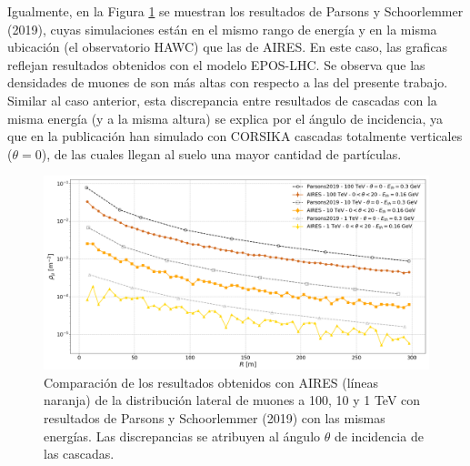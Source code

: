 \documentclass[12pt,letterpaper]{report}
\begin{document}
Igualmente, en la Figura \ref{fig:comparacion_parsons} se muestran los resultados de Parsons y Schoorlemmer (2019), cuyas simulaciones est\'an en el mismo rango de energ\'ia y en la misma ubicaci\'on (el observatorio HAWC) \cite{Parsons2019} que las de AIRES. En este caso, las graficas reflejan resultados obtenidos con el modelo EPOS-LHC. Se observa que las densidades de muones de \cite{Parsons2019} son m\'as altas con respecto a las del presente trabajo. Similar al caso anterior, esta discrepancia entre resultados de cascadas con la misma energ\'ia (y a la misma altura) se explica por el \'angulo de incidencia, ya que en la publicaci\'on han simulado con CORSIKA cascadas totalmente verticales ($\theta=0$), de las cuales llegan al suelo una mayor cantidad de part\'iculas.
	\begin{figure}[] 
	\includegraphics[width=\textwidth]{Figuras/comparacion_parsons2019}
	\caption{Comparaci\'on de los resultados obtenidos con AIRES (l\'ineas naranja) de la distribuci\'on lateral de muones a 100, 10 y 1 TeV con resultados de Parsons y Schoorlemmer (2019) \cite{Parsons2019} con las mismas energ\'ias. Las discrepancias se atribuyen al \'angulo $\theta$ de incidencia de las cascadas.}
	\label{fig:comparacion_parsons}
	\end{figure}	
	
	
\end{document}
